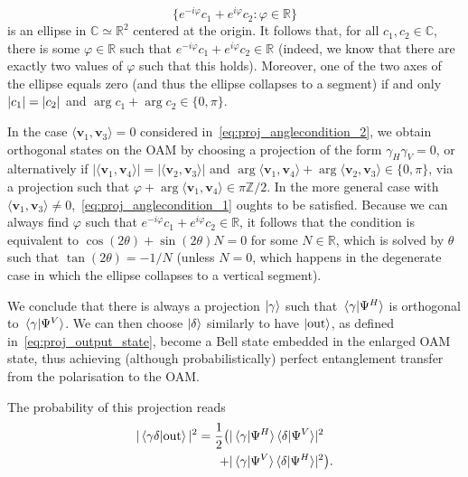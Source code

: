 \documentclass[
	aps, pra, authorblock, superscriptaddress, twocolumn,
	10pt
]{revtex4-1}
\newcommand{\bs}[1]{\boldsymbol{#1}}
\newcommand{\on}[1]{\operatorname{#1}}
\newcommand{\CC}{\mathbb{C}}
\newcommand{\RR}{\mathbb{R}}
\newcommand{\ZZ}{\mathbb{Z}}
\begin{document}
\begin{equation}
    \{e^{-i\varphi}c_1 +
        e^{i\varphi}c_2: \varphi\in\RR\}
\end{equation}
is an ellipse in $\CC\simeq\RR^2$ centered at the origin.
It follows that, for all $c_1,c_2\in\CC$, there is some $\varphi\in\mathbb R$ such that $e^{-i\varphi}c_1 + e^{i\varphi}c_2\in\RR$ (indeed, we know that there are exactly two values of $\varphi$ such that this holds).
Moreover, one of the two axes of the ellipse equals zero (and thus the ellipse collapses to a segment) if and only $\abs{c_1}=\abs{c_2}$ and $\arg c_1+\arg c_2\in\{0,\pi\}$.

In the case $\langle\bs v_1,\bs v_3\rangle=0$ considered in~\cref{eq:proj_anglecondition_2}, we obtain orthogonal states on the OAM by choosing a projection of the form $\gamma_H \gamma_V=0$, or alternatively if $|\langle\bs v_1,\bs v_4\rangle|=|\langle\bs v_2,\bs v_3\rangle|$ and $\arg \langle\bs v_1,\bs v_4\rangle+\arg \langle\bs v_2,\bs v_3\rangle\in\{0,\pi\}$, via a projection such that $\varphi+\arg \langle\bs v_1,\bs v_4\rangle\in  \pi \ZZ/2$.
In the more general case with $\langle\bs v_1,\bs v_3\rangle\neq0$,~\cref{eq:proj_anglecondition_1} oughts to be satisfied. Because we can always find $\varphi$ such that $e^{-i\varphi}c_1+e^{i\varphi}c_2\in\RR$, it follows that the condition is equivalent to $\cos(2\theta)+\sin(2\theta)N=0$ for some $N\in\RR$, which is solved by $\theta$ such that $\tan(2\theta)=-1/N$ (unless $N=0$, which happens in the degenerate case in which the ellipse collapses to a vertical segment).

We conclude that there is always a projection $\ket\gamma$ such that $\braket*{\gamma}{\Psi^H}$ is orthogonal to $\braket*{\gamma}{\Psi^V}$. We can then choose $\ket\delta$ similarly to have $\ket{\on{out}}$, as defined in~\cref{eq:proj_output_state}, become a Bell state embedded in the enlarged OAM state, thus achieving (although probabilistically) perfect entanglement transfer from the polarisation to the OAM.

The probability of this projection reads
\begin{equation}
\begin{aligned}
    |\braket{\gamma\delta}{\on{out}}|^2 =
    \frac{1}{2}\big(
        &\lvert\braket*{\gamma}{\Psi^H}\!
        \braket*{\delta}{\Psi^V}\rvert^2 \\
        +
        &\lvert\braket*{\gamma}{\Psi^V}\!
        \braket*{\delta}{\Psi^H}\rvert^2
    \big).
\end{aligned}
\end{equation}
\end{document}
